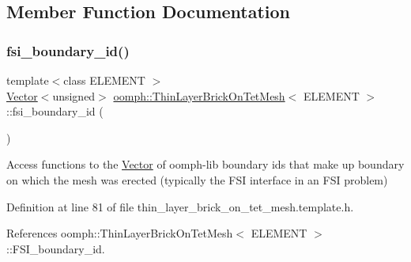 \subsection{Member Function Documentation}
\mbox{\label{classoomph_1_1ThinLayerBrickOnTetMesh_ada2e50ab8dfb631a26fc4111eb2fe9ad}} 
\subsubsection{\texorpdfstring{fsi\+\_\+boundary\+\_\+id()}{fsi\_boundary\_id()}}
{\footnotesize\ttfamily template$<$class E\+L\+E\+M\+E\+NT $>$ \\
\hyperlink{classoomph_1_1Vector}{Vector}$<$unsigned$>$ \hyperlink{classoomph_1_1ThinLayerBrickOnTetMesh}{oomph\+::\+Thin\+Layer\+Brick\+On\+Tet\+Mesh}$<$ E\+L\+E\+M\+E\+NT $>$\+::fsi\+\_\+boundary\+\_\+id (\begin{DoxyParamCaption}{ }\end{DoxyParamCaption})\hspace{0.3cm}{\ttfamily [inline]}}



Access functions to the \hyperlink{classoomph_1_1Vector}{Vector} of oomph-\/lib boundary ids that make up boundary on which the mesh was erected (typically the F\+SI interface in an F\+SI problem) 



Definition at line 81 of file thin\+\_\+layer\+\_\+brick\+\_\+on\+\_\+tet\+\_\+mesh.\+template.\+h.



References oomph\+::\+Thin\+Layer\+Brick\+On\+Tet\+Mesh$<$ E\+L\+E\+M\+E\+N\+T $>$\+::\+F\+S\+I\+\_\+boundary\+\_\+id.

\mbox{\label{classoomph_1_1ThinLayerBrickOnTetMesh_a3cfd55eb5bbd6801e9d4cd271e602cd8}} 
